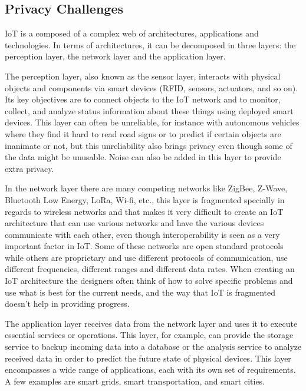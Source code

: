 \subsection{Privacy Challenges}

IoT is a composed of a complex web of architectures, applications and technologies.
In terms of architectures, it can be decomposed in three layers: the perception
layer, the network layer and the application layer.

The perception layer, also known as the sensor layer, interacts with physical
objects and components via smart devices (RFID, sensors, actuators, and
so on). Its key objectives are to connect objects to the IoT network and
to monitor, collect, and analyze status information about these things using
deployed smart devices. This layer can often be unreliable, for instance
with autonomous vehicles where they find it hard to read road signs or to
predict if certain objects are inanimate or not, but this unreliability
also brings privacy even though some of the data might be unusable. Noise
can also be added in this layer to provide extra privacy.

In the network layer there are many competing networks like ZigBee, Z-Wave,
Bluetooth Low Energy, LoRa, Wi-fi, etc., this layer is fragmented specially
in regards to wireless networks and that makes it very difficult to create
an IoT architecture that can use various networks and have the various
devices communicate with each other, even though interoperability is seen
as a very important factor in IoT. Some of these networks are open standard
protocols while others are proprietary and use different protocols of communication,
use different frequencies, different ranges and different data rates. When
creating an IoT architecture the designers often think of how to solve
specific problems and use what is best for the current needs, and the way
that IoT is fragmented doesn't help in providing progress.

The application layer receives data from the network layer and uses it to
execute essential services or operations. This layer, for example, can provide
the storage service to backup incoming data into a database or the analysis
service to analyze received data in order to predict the future state of
physical devices. This layer encompasses a wide range of applications, each
with its own set of requirements. A few examples are smart grids, smart
transportation, and smart cities.

